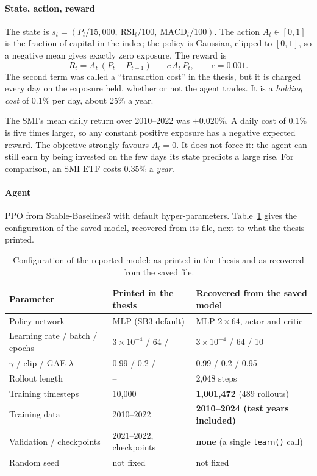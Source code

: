 \documentclass[11pt,a4paper]{article}
\begin{document}
\paragraph{State, action, reward} The state is $s_t = (P_t/15{,}000,\ \mathrm{RSI}_t/100,\ \mathrm{MACD}_t/100)$. The action $A_t\in[0,1]$ is the fraction of capital in the index; the policy is Gaussian, clipped to $[0,1]$, so a negative mean gives exactly zero exposure. The reward is
\begin{equation}
R_t = A_t\,(P_t - P_{t-1}) \;-\; c\,A_t\,P_t, \qquad c = 0.001 .
\end{equation}
The second term was called a ``transaction cost'' in the thesis, but it is charged every day on the exposure held, whether or not the agent trades. It is a \emph{holding cost} of 0.1\% per day, about 25\% a year.

\begin{keybox}
\small
The SMI's mean daily return over 2010--2022 was $+0.020\%$. A daily cost of $0.1\%$ is five times larger, so any constant positive exposure has a negative expected reward. The objective strongly favours $A_t=0$. It does not force it: the agent can still earn by being invested on the few days its state predicts a large rise. For comparison, an SMI ETF costs $0.35\%$ a \emph{year}.
\end{keybox}

\paragraph{Agent} PPO from Stable-Baselines3 \citep{raffin2021} with default hyper-parameters. Table~\ref{tab:config} gives the configuration of the saved model, recovered from its file, next to what the thesis printed.

\begin{table}[ht]
\centering\small
\caption{Configuration of the reported model: as printed in the thesis and as recovered from the saved file.}
\label{tab:config}
\begin{tabular}{@{}lll@{}}
\toprule
\textbf{Parameter} & \textbf{Printed in the thesis} & \textbf{Recovered from the saved model} \\
\midrule
Policy network & MLP (SB3 default) & MLP $2\times64$, actor and critic \\
Learning rate / batch / epochs & $3\times10^{-4}$ / 64 / -- & $3\times10^{-4}$ / 64 / 10 \\
$\gamma$ / clip / GAE $\lambda$ & 0.99 / 0.2 / -- & 0.99 / 0.2 / 0.95 \\
Rollout length & -- & 2,048 steps \\
Training timesteps & 10,000 & \textbf{1,001,472} (489 rollouts) \\
Training data & 2010--2022 & \textbf{2010--2024 (test years included)} \\
Validation / checkpoints & 2021--2022, checkpoints & \textbf{none} (a single \texttt{learn()} call) \\
Random seed & not fixed & not fixed \\
\bottomrule
\end{tabular}
\end{table}
\end{document}
